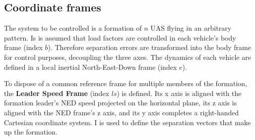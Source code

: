 \documentclass{ifacconf}
\begin{document}
\subsection{Coordinate frames}
The system to be controlled is a formation of $n$ UAS flying in an arbitrary pattern. Is is assumed that
load factors are controlled in each vehicle's body frame (index $b$). Therefore separation errors are transformed into the body frame for control purposes, decoupling the three axes. The dynamics of each vehicle are defined in a local inertial North-East-Down frame (index $e$).


To dispose of a common reference frame for multiple members of the formation, the \textbf{Leader Speed Frame} (index $ls$) is defined. Its x axis is aligned with the formation leader's NED speed projected on the horizontal plane, its z axis is aligned with the NED frame's z axis, and its y axis completes a right-handed Cartesian coordinate system. I is used to define the separation vectors that make up the formation.
\end{document}
